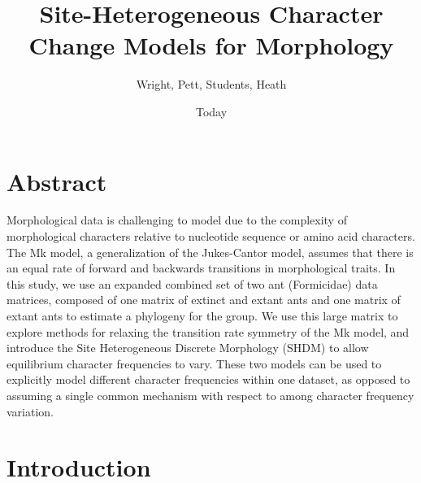 \documentclass[]{article}
\begin{document}
\title{Site-Heterogeneous Character Change Models for Morphology}
\author{Wright, Pett, Students, Heath}
\date{Today}
\maketitle

\section{Abstract}

Morphological data is challenging to model due to the complexity of morphological characters relative to nucleotide sequence or amino acid characters. 
The Mk model, a generalization of the Jukes-Cantor model, assumes that there is an equal rate of forward and backwards transitions in morphological traits.
In this study, we use an expanded combined set of two ant (Formicidae) data matrices, composed of one matrix of extinct and extant ants and one matrix of extant ants to estimate a phylogeny for the group.
We use this large matrix to explore methods for relaxing the transition rate symmetry of the Mk model, and introduce the Site Heterogeneous Discrete Morphology (SHDM) to allow equilibrium character frequencies to vary. 
These two models can be used to explicitly model different character frequencies within one dataset, as opposed to assuming a single common mechanism with respect to among character frequency variation.

\section{Introduction}
\end{document}
